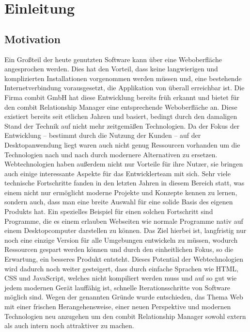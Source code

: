 \chapter{Einleitung}
\label{chap:introduction}

\section{Motivation}
Ein Großteil der heute genutzten Software kann über eine Weboberfläche angesprochen werden. Dies hat den Vorteil, dass keine langwierigen und komplizierten Installationen vorgenommen werden müssen und, eine bestehende Internetverbindung vorausgesetzt, die Applikation von überall erreichbar ist. Die Firma combit GmbH hat diese Entwicklung bereits früh erkannt und bietet für den combit Relationship Manager eine entsprechende Weboberfläche an. Diese existiert bereits seit etlichen Jahren und basiert, bedingt durch den damaligen Stand der Technik auf nicht mehr zeitgemäßen Technologien. Da der Fokus der Entwicklung -- bestimmt durch die Nutzung der Kunden -- auf der Desktopanwendung liegt waren auch nicht genug Ressourcen vorhanden um die Technologien nach und nach durch modernere Alternativen zu ersetzen.
Webtechnologien haben außerdem nicht nur Vorteile für ihre Nutzer, sie bringen auch einige interessante Aspekte für das Entwicklerteam mit sich. Sehr viele technische Fortschritte fanden in den letzten Jahren in diesem Bereich statt, was einem nicht nur ermöglicht moderne Projekte und Konzepte kennen zu lernen, sondern auch, dass man eine breite Auswahl für eine solide Basis des eigenen Produkts hat. Ein spezielles Beispiel für einen solchen Fortschritt sind Programme, die es einem erlauben Webseiten wie normale Programme nativ auf einem Desktopcomputer darstellen zu können. Das Ziel hierbei ist, langfristig nur noch eine einzige Version für alle Umgebungen entwickeln zu müssen, wodurch Ressourcen gespart werden können und durch den einheitlichen Fokus, so die Erwartung, ein besseres Produkt entsteht. Dieses Potential der Webtechnologien wird dadurch noch weiter gesteigert, dass durch einfache Sprachen wie HTML, CSS und JavaScript, welches nicht kompiliert werden muss und auf so gut wie jedem modernen Gerät lauffähig ist, schnelle Iterationsschritte von Software möglich sind.
Wegen der genannten Gründe wurde entschieden, das Thema Web mit einer frischen Herangehensweise, einer neuen Perspektive und modernen Technologien neu anzugehen um den combit Relationship Manager sowohl extern als auch intern noch attraktiver zu machen.

